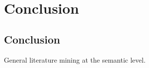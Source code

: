 \chapter{Conclusion}  %

\ifpdf
    \graphicspath{{Conclusion/Figs/Raster/}{Conclusion/Figs/PDF/}{Conclusion/Figs/}}
\else
    \graphicspath{{Conclusion/Figs/Vector/}{Conclusion/Figs/}}
\fi

\section{Conclusion} %
General literature mining at the semantic level.